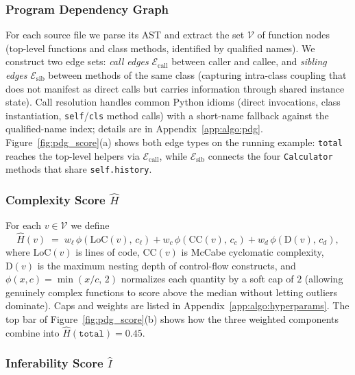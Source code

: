 \subsubsection{Program Dependency Graph}
\label{sec:method:pdg}

For each source file we parse its AST and extract the set $\mathcal{V}$
of function nodes (top-level functions and class methods, identified by
qualified names). We construct two edge sets: \emph{call edges}
$\mathcal{E}_{\mathrm{call}}$ between caller and callee, and
\emph{sibling edges} $\mathcal{E}_{\mathrm{sib}}$ between methods of the
same class (capturing intra-class coupling that does not manifest as
direct calls but carries information through shared instance state).
Call resolution handles common Python idioms (direct invocations, class
instantiation, \texttt{self}/\texttt{cls} method calls) with a
short-name fallback against the qualified-name index; details are in
Appendix~\ref{app:algo:pdg}.
Figure~\ref{fig:pdg_score}(a) shows both edge types on the running
example: \texttt{total} reaches the top-level helpers via
$\mathcal{E}_{\mathrm{call}}$, while $\mathcal{E}_{\mathrm{sib}}$
connects the four \texttt{Calculator} methods that share
\texttt{self.history}.

\subsubsection{Complexity Score $\hat{H}$}
\label{sec:method:complexity}

For each $v \in \mathcal{V}$ we define
%
\begin{equation}
  \hat{H}(v) \;=\; w_{\ell}\,\phi\!\left(\mathrm{LoC}(v),\,c_{\ell}\right)
            + w_{c}\,\phi\!\left(\mathrm{CC}(v),\,c_{c}\right)
            + w_{d}\,\phi\!\left(\mathrm{D}(v),\,c_{d}\right),
  \label{eq:complexity}
\end{equation}
%
where $\mathrm{LoC}(v)$ is lines of code, $\mathrm{CC}(v)$ is McCabe
cyclomatic complexity, $\mathrm{D}(v)$ is the maximum nesting depth of
control-flow constructs, and $\phi(x, c) = \min(x / c,\, 2)$ normalizes
each quantity by a soft cap of $2$ (allowing genuinely complex functions
to score above the median without letting outliers dominate). Caps and
weights are listed in Appendix~\ref{app:algo:hyperparams}. The top bar
of Figure~\ref{fig:pdg_score}(b) shows how the three weighted
components combine into $\hat{H}(\texttt{total})\!=\!0.45$.

\subsubsection{Inferability Score $\hat{I}$}
\label{sec:method:inferability}

